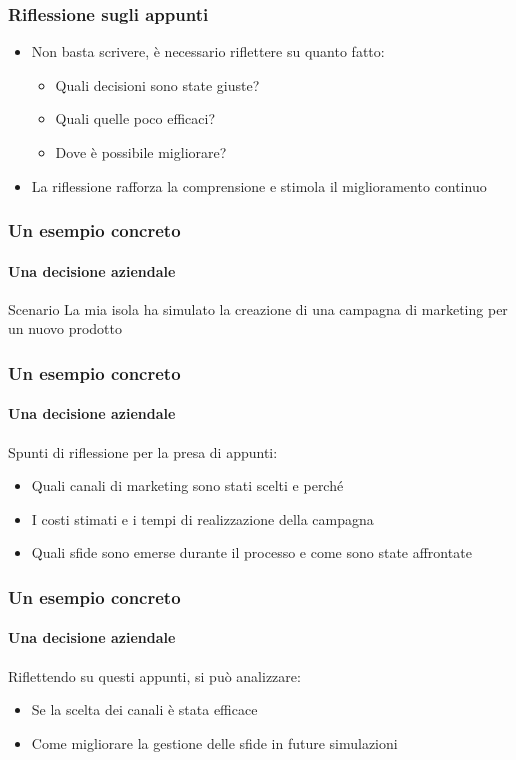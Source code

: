 \documentclass{beamer}
\begin{document}
\begin{frame}
  \frametitle{Riflessione sugli appunti}

  \begin{itemize}
    \item Non basta scrivere, è necessario riflettere su quanto fatto:
      \begin{itemize}
      \item Quali decisioni sono state giuste?
      \item Quali quelle poco efficaci?
      \item Dove è possibile migliorare?
      \end{itemize}
    \item La riflessione rafforza la comprensione e stimola il miglioramento continuo
  \end{itemize}
\end{frame}

\begin{frame}
  \frametitle{Un esempio concreto}
  \framesubtitle{Una decisione aziendale}
  \begin{block}{Scenario}
    La mia isola ha simulato la creazione di una campagna di marketing per un nuovo prodotto
  \end{block}
\end{frame}

\begin{frame}
  \frametitle{Un esempio concreto}
  \framesubtitle{Una decisione aziendale}
  Spunti di riflessione per la presa di appunti:
      \begin{itemize}
        \item Quali canali di marketing sono stati scelti e perché
        \item I costi stimati e i tempi di realizzazione della campagna
        \item Quali sfide sono emerse durante il processo e come sono state affrontate
      \end{itemize}
\end{frame}

\begin{frame}
  \frametitle{Un esempio concreto}
  \framesubtitle{Una decisione aziendale}
  Riflettendo su questi appunti, si può analizzare:
  \begin{itemize}
  \item Se la scelta dei canali è stata efficace
  \item Come migliorare la gestione delle sfide in future simulazioni
  \end{itemize}
\end{frame}
\end{document}
